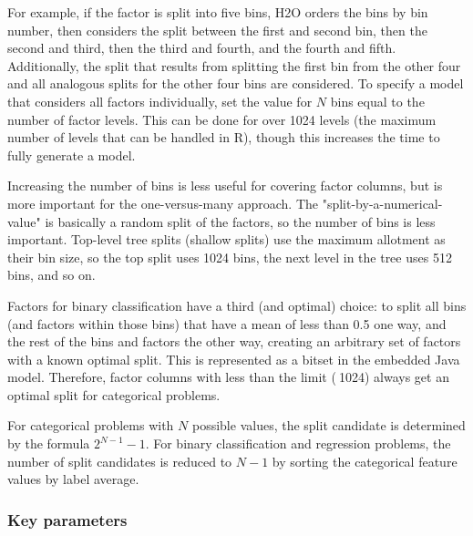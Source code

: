 \documentclass{article}[11pt]
\begin{document}
{For example, if the factor is split into five bins, H2O orders the bins by bin number, then considers the split between the first and second bin, then the second and third, then the third and fourth, and the fourth and fifth. Additionally, the split that results from splitting the first bin from the other four and all analogous splits for the other four bins are considered. To specify a model that considers all factors individually, set the value for $N$ bins equal to the number of factor levels. This can be done for over 1024 levels (the maximum number of levels that can be handled in R), though this increases the time to fully generate a model. 

Increasing the number of bins is less useful for covering factor columns, but is more important for the one-versus-many approach. The "split-by-a-numerical-value" is basically a random split of the factors, so the number of bins is less important. Top-level tree splits (shallow splits) use the maximum allotment as their bin size, so the top split uses 1024 bins, the next level in the tree uses 512 bins, and so on. 

Factors for binary classification have a third (and optimal) choice: to split all bins (and factors within those bins) that have a mean of less than 0.5 one way, and the rest of the bins and factors the other way, creating an arbitrary set of factors with a known optimal split. This is represented as a bitset in the embedded Java model. Therefore, factor columns with less than the limit ($~$1024) always get an optimal split for categorical problems. 

For categorical problems with $N$ possible values, the split candidate is determined by the formula $2^{N-1}-1$. For binary classification and regression problems, the number of split candidates is reduced to $N-1$ by sorting the categorical feature values by label average. 


\subsubsection{Key parameters}

}
\end{document}
